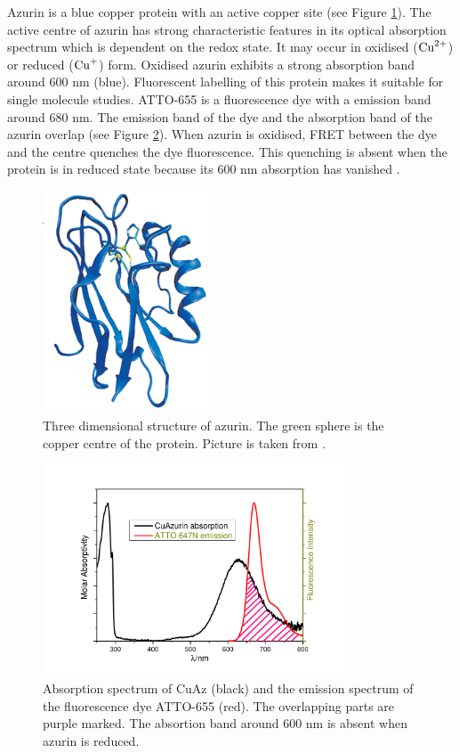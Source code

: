 \documentclass[twoside,single]{lion-msc}
\begin{document}
Azurin is a blue copper protein with an active copper site (see Figure \ref{azurin}). The active centre of azurin has strong characteristic features in its optical absorption spectrum which is dependent on the redox state. It may occur in oxidised ($\textup{Cu}^{2+}$) or reduced ($\textup{Cu}^{+}$) form. Oxidised azurin exhibits a strong absorption band around 600 nm (blue). Fluorescent labelling of this protein makes it suitable for single molecule studies. ATTO-655 is a fluorescence dye with a emission band around 680 nm. The emission band of the dye and the absorption band of the azurin overlap (see Figure \ref{absorption}). When azurin is oxidised, FRET between the dye and the centre quenches the dye fluorescence. This quenching is absent when the protein is in reduced state because its 600 nm absorption has vanished \cite{Tabares2014}.

\begin{figure}[ht!]
\centering
\includegraphics[width=50mm]{azurin1}
\caption{Three dimensional structure of azurin. The green sphere is the copper centre of the protein. Picture is taken from \cite{BORMAN2010}.} 
\label{azurin}
\end{figure}

\begin{figure}[ht!]
\centering
\includegraphics[width=90mm]{absorp.pdf}
\caption{Absorption spectrum of CuAz (black) and the emission spectrum of the fluorescence dye ATTO-655 (red). The overlapping parts are purple marked. The absortion band around 600 nm is absent when azurin is reduced.} 
\label{absorption}
\end{figure}
\end{document}
